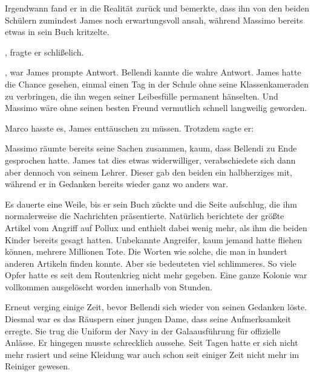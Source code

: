 Irgendwann fand er in die Realität zurück und bemerkte, dass ihn von den beiden Schülern zumindest James noch erwartungsvoll ansah, während Massimo bereits etwas in sein Buch kritzelte.

\par

, fragte er schlißelich.

\par

, war James prompte Antwort. Bellendi kannte die wahre Antwort. James hatte die Chance gesehen, einmal einen Tag in der Schule ohne seine Klassenkameraden zu verbringen, die ihn wegen seiner Leibesfülle permanent hänselten. Und Massimo wäre ohne seinen besten Freund vermutlich schnell langweilig geworden.

\par

Marco hasste es, James enttäuschen zu müssen. Trotzdem sagte er: 

\par

Massimo räumte bereits seine Sachen zusammen, kaum, dass Bellendi zu Ende gesprochen hatte. James tat dies etwas widerwilliger, verabschiedete sich dann aber dennoch von seinem Lehrer. Dieser gab den beiden ein halbherziges  mit, während er in Gedanken bereits wieder ganz wo anders war.

\par

Es dauerte eine Weile, bis er sein Buch zückte und die Seite aufschlug, die ihm normalerweise die Nachrichten präsentierte. Natürlich berichtete der größte Artikel vom Angriff auf Pollux und enthielt dabei wenig mehr, als ihm die beiden Kinder bereits gesagt hatten. Unbekannte Angreifer, kaum jemand hatte fliehen können, mehrere Millionen Tote. Die Worten wie solche, die man in hundert anderen Artikeln finden konnte. Aber sie bedeuteten viel schlimmeres. So viele Opfer hatte es seit dem Routenkrieg nicht mehr gegeben. Eine ganze Kolonie war vollkommen ausgelöscht worden innerhalb von Stunden.

\par

Erneut verging einige Zeit, bevor Bellendi sich wieder von seinen Gedanken löste. Diesmal war es das Räuspern einer jungen Dame, dass seine Aufmerksamkeit erregte. Sie trug die Uniform der Navy in der Galaausführung für offizielle Anlässe. Er hingegen musste schrecklich aussehe. Seit Tagen hatte er sich nicht mehr rasiert und seine  Kleidung war auch schon seit einiger Zeit nicht mehr im Reiniger gewesen.

